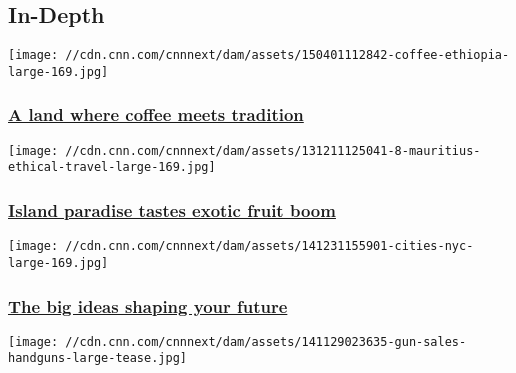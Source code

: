 \hypertarget{in-depth-}{%
\subsection{In-Depth~}\label{in-depth-}}

\href{/2015/04/01/africa/ethiopia-coffee-industry/index.html}{}

\texttt{[image: //cdn.cnn.com/cnnnext/dam/assets/150401112842-coffee-ethiopia-large-169.jpg]}

\hypertarget{a-land-where-coffee-meets-tradition}{%
\subsubsection{\texorpdfstring{\href{/2015/04/01/africa/ethiopia-coffee-industry/index.html}{A
land where coffee meets
tradition}}{A land where coffee meets tradition}}\label{a-land-where-coffee-meets-tradition}}

\href{/2015/03/18/business/mauritius-fresh-fruit/index.html}{}

\texttt{[image: //cdn.cnn.com/cnnnext/dam/assets/131211125041-8-mauritius-ethical-travel-large-169.jpg]}

\hypertarget{island-paradise-tastes-exotic-fruit-boom}{%
\subsubsection{\texorpdfstring{\href{/2015/03/18/business/mauritius-fresh-fruit/index.html}{Island
paradise tastes exotic fruit
boom}}{Island paradise tastes exotic fruit boom}}\label{island-paradise-tastes-exotic-fruit-boom}}

\href{http://money.cnn.com/technology/most-innovative-cities/}{}

\texttt{[image: //cdn.cnn.com/cnnnext/dam/assets/141231155901-cities-nyc-large-169.jpg]}

\hypertarget{the-big-ideas-shaping-your-future}{%
\subsubsection{\texorpdfstring{\href{http://money.cnn.com/technology/most-innovative-cities/}{The
big ideas shaping your
future}}{The big ideas shaping your future}}\label{the-big-ideas-shaping-your-future}}

\href{http://www.cnn.com/interactive/2014/12/us/cnn-guns-project/index.html}{}

\texttt{[image: //cdn.cnn.com/cnnnext/dam/assets/141129023635-gun-sales-handguns-large-tease.jpg]}

